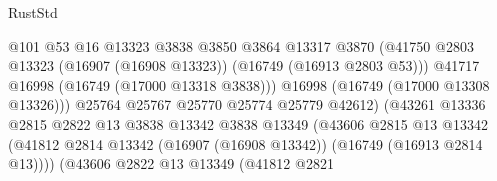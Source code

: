 \begin{lexlean}{RustStd}
\begin{coremodule}
                                              @101
                                              @53
                                              @16
                                              @13323
                                              @3838
                                              @3850
                                              @3864
                                              @13317
                                              @3870
                                              (@41750
                                                @2803
                                                @13323
                                                (@16907 (@16908 @13323))
                                                (@16749 (@16913 @2803 @53)))
                                              @41717
                                              @16998
                                              (@16749 (@17000 @13318 @3838)))
                                            @16998
                                            (@16749 (@17000 @13308 @13326)))
                                          @25764
                                          @25767
                                          @25770
                                          @25774
                                          @25779
                                          @42612)
                                        (@43261
                                          @13336
                                          @2815
                                          @2822
                                          @13
                                          @3838
                                          @13342
                                          @3838
                                          @13349
                                          (@43606
                                            @2815
                                            @13
                                            @13342
                                            (@41812
                                              @2814
                                              @13342
                                              (@16907 (@16908 @13342))
                                              (@16749 (@16913 @2814 @13))))
                                          (@43606
                                            @2822
                                            @13
                                            @13349
                                            (@41812
                                              @2821

\end{coremodule}
\end{lexlean}
